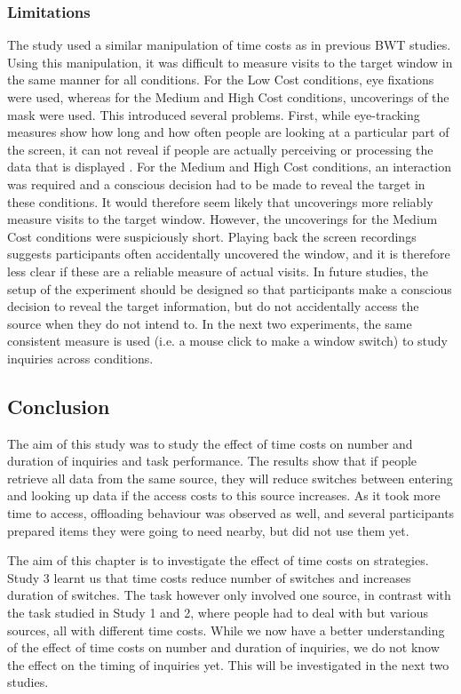  \subsubsection{Limitations}
 The study used a similar manipulation of time costs as in previous BWT studies. Using this manipulation, it was difficult to measure visits to the target window in the same manner for all conditions. For the Low Cost conditions, eye fixations were used, whereas for the Medium and High Cost conditions, uncoverings of the mask were used. This introduced several problems. First, while eye-tracking measures show how long and how often people are looking at a particular part of the screen, it can not reveal if people are actually perceiving or processing the data that is displayed \citep{Waldron2007}. For the Medium and High Cost conditions, an interaction was required and a conscious decision had to be made to reveal the target in these conditions. It would therefore seem likely that uncoverings more reliably measure visits to the target window. However, the uncoverings for the Medium Cost conditions were suspiciously short. Playing back the screen recordings suggests participants often accidentally uncovered the window, and it is therefore less clear if these are a reliable measure of actual visits. In future studies, the setup of the experiment should be designed so that participants make a conscious decision to reveal the target information, but do not accidentally access the source when they do not intend to. In the next two experiments, the same consistent measure is used (i.e. a mouse click to make a window switch) to study inquiries across conditions. 
 
 \subsection{Conclusion}
The aim of this study was to study the effect of time costs on number and duration of inquiries and task performance. The results show that if people retrieve all data from the same source, they will reduce switches between entering and looking up data if the access costs to this source increases. As it took more time to access, offloading behaviour was observed as well, and several participants prepared items they were going to need nearby, but did not use them yet. 

The aim of this chapter is to investigate the effect of time costs on strategies. Study 3 learnt us that time costs reduce number of switches and increases duration of switches. The task however only involved one source, in contrast with the task studied in Study 1 and 2, where people had to deal with but various sources, all with different time costs. While we now have a better understanding of the effect of time costs on number and duration of inquiries, we do not know the effect on the timing of inquiries yet. This will be investigated in the next two studies.

